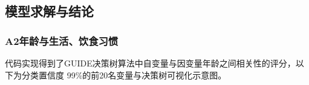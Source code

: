 \documentclass{article}
\numberwithin{equation}{subsection}
\begin{document}
\subsection{模型求解与结论}
\subsubsection{A2年龄与生活、饮食习惯}
代码实现得到了GUIDE决策树算法中自变量与因变量年龄之间相关性的评分，以下为分类置信度 99\%的前20名变量与决策树可视化示意图。
\begin{figure}[htbp]
    \centering
\end{figure}
\end{document}
